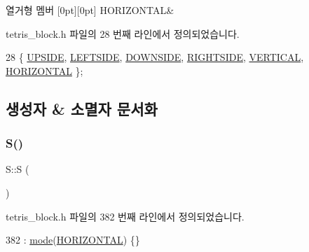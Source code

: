 \begin{DoxyEnumFields}{열거형 멤버}
[0pt][0pt]{}\mbox{\label{class_block_a33a96023993478ad4b52426188454765a883bda1b4a0cb6d25d8b3c3465f0cfef}} 
H\+O\+R\+I\+Z\+O\+N\+T\+AL&\\
\hline

\end{DoxyEnumFields}


tetris\+\_\+block.\+h 파일의 28 번째 라인에서 정의되었습니다.


\begin{DoxyCode}
28 \{ \mbox{\hyperlink{class_block_a33a96023993478ad4b52426188454765a4529e89ca1c08cc5f81181e355719fad}{UPSIDE}}, \mbox{\hyperlink{class_block_a33a96023993478ad4b52426188454765a9c855bf91465e7da98901d7900740919}{LEFTSIDE}}, \mbox{\hyperlink{class_block_a33a96023993478ad4b52426188454765a73fd4ad0ff8642235ec8549f9290d13b}{DOWNSIDE}}, \mbox{\hyperlink{class_block_a33a96023993478ad4b52426188454765a005424e665ea0b83edfaf9ddb3ab85a1}{RIGHTSIDE}}, \mbox{\hyperlink{class_block_a33a96023993478ad4b52426188454765a76628d7877667ccb2f6e549b89466a4a}{VERTICAL}}, 
      \mbox{\hyperlink{class_block_a33a96023993478ad4b52426188454765a883bda1b4a0cb6d25d8b3c3465f0cfef}{HORIZONTAL}} \}; 
\end{DoxyCode}


\subsection{생성자 \& 소멸자 문서화}
\mbox{\label{class_s_a375a5fe3ea61076cbb372c47fcd6eecd}} 
\subsubsection{\texorpdfstring{S()}{S()}}
{\footnotesize\ttfamily S\+::S (\begin{DoxyParamCaption}{ }\end{DoxyParamCaption})\hspace{0.3cm}{\ttfamily [inline]}}



tetris\+\_\+block.\+h 파일의 382 번째 라인에서 정의되었습니다.


\begin{DoxyCode}
382 : \mbox{\hyperlink{class_s_a0a3c150f9afbfe65a5558d947b999776}{mode}}(\mbox{\hyperlink{class_block_a33a96023993478ad4b52426188454765a883bda1b4a0cb6d25d8b3c3465f0cfef}{HORIZONTAL}}) \{\}
\end{DoxyCode}


